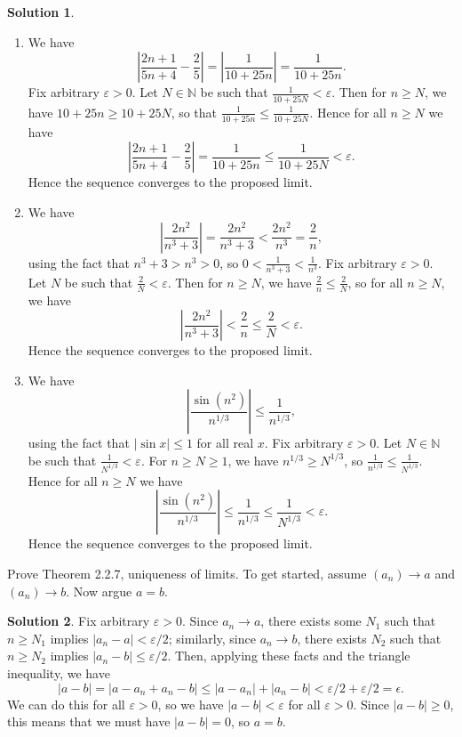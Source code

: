 \documentclass[12pt]{article}
\theoremstyle{definition}
\theoremstyle{definition}
\newtheorem*{soln}{Solution}
\newcommand{\N}{\mathbb{N}}
\begin{document}
\begin{soln}
\begin{enumerate}[label=(\alph*)]
\item We have
\[\left|\frac{2n+1}{5n+4}-\frac{2}{5}\right| = \left|\frac{1}{10+25n}\right| = \frac{1}{10+25n}.\]
Fix arbitrary $\varepsilon>0$. Let $N\in\N$ be such that $\frac{1}{10+25N}<\varepsilon$. Then for $n\geq N$, we have $10+25n\geq 10+25N$, so that $\frac{1}{10+25n}\leq \frac{1}{10+25N}$. Hence for all $n\geq N$ we have
\[\left|\frac{2n+1}{5n+4}-\frac{2}{5}\right|=\frac{1}{10+25n}\leq\frac{1}{10+25N}<\varepsilon.\]
Hence the sequence converges to the proposed limit.

\item We have 
\[\left|\frac{2n^2}{n^3+3}\right|=\frac{2n^2}{n^3+3}<\frac{2n^2}{n^3}=\frac{2}{n},\]
using the fact that $n^3+3>n^3>0$, so $0<\frac{1}{n^3+3}<\frac{1}{n^3}$. Fix arbitrary $\varepsilon>0$. Let $N$ be such that $\frac{2}{N}<\varepsilon$. Then for $n\geq N$, we have $\frac{2}{n}\leq \frac{2}{N}$, so for all $n\geq N$, we have
\[\left|\frac{2n^2}{n^3+3}\right|<\frac{2}{n}\leq \frac{2}{N}<\varepsilon.\]
Hence the sequence converges to the proposed limit.

\item We have
\[\left|\frac{\sin(n^2)}{n^{1/3}}\right|\leq \frac{1}{n^{1/3}},\]
using the fact that $|\sin x|\leq 1$ for all real $x$. Fix arbitrary $\varepsilon>0$. Let $N\in\N$ be such that $\frac{1}{N^{1/3}}<\varepsilon$. For $n\geq N\geq 1$, we have $n^{1/3}\geq N^{1/3}$, so $\frac{1}{n^{1/3}}\leq \frac{1}{N^{1/3}}$. Hence for all $n\geq N$ we have
\[\left|\frac{\sin(n^2)}{n^{1/3}}\right|\leq \frac{1}{n^{1/3}}\leq \frac{1}{N^{1/3}}<\varepsilon.\]
Hence the sequence converges to the proposed limit.
\end{enumerate}
\end{soln}

\begin{prob}
Prove Theorem 2.2.7, uniqueness of limits. To get started, assume $(a_n)\to a$ and $(a_n)\to b$. Now argue $a=b$.
\end{prob}

\begin{soln}
Fix arbitrary $\varepsilon>0$. Since $a_n\to a$, there exists some $N_1$ such that $n\geq N_1$ implies $|a_n-a|<\varepsilon/2$; similarly, since $a_n\to b$, there exists $N_2$ such that $n\geq N_2$ implies $|a_n-b|\leq \varepsilon/2$. Then, applying these facts and the triangle inequality, we have
\[|a-b|=|a-a_n+a_n-b|\leq |a-a_n|+|a_n-b|<\varepsilon/2+\varepsilon/2=\epsilon.\]
We can do this for all $\varepsilon>0$, so we have $|a-b|<\varepsilon$ for all $\varepsilon>0$. Since $|a-b|\geq 0$, this means that we must have $|a-b|=0$, so $a=b$.
\end{soln}
\end{document}
